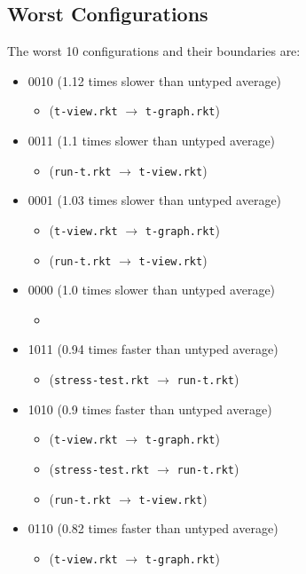 \documentclass{article}
\newcommand{\mono}[1]{\texttt{#1}}
\begin{document}
\subsection{Worst Configurations}
The worst 10 configurations and their boundaries are:
\begin{itemize}
\item 0010 (1.12 times slower than untyped average)
  \begin{itemize}
  \item (\mono{t-view.rkt} $\rightarrow$ \mono{t-graph.rkt})
  \end{itemize}
\item 0011 (1.1 times slower than untyped average)
  \begin{itemize}
  \item (\mono{run-t.rkt} $\rightarrow$ \mono{t-view.rkt})
  \end{itemize}
\item 0001 (1.03 times slower than untyped average)
  \begin{itemize}
  \item (\mono{t-view.rkt} $\rightarrow$ \mono{t-graph.rkt})
  \item (\mono{run-t.rkt} $\rightarrow$ \mono{t-view.rkt})
  \end{itemize}
\item 0000 (1.0 times slower than untyped average)
  \begin{itemize}
  \item 
  \end{itemize}
\item 1011 (0.94 times faster than untyped average)
  \begin{itemize}
  \item (\mono{stress-test.rkt} $\rightarrow$ \mono{run-t.rkt})
  \end{itemize}
\item 1010 (0.9 times faster than untyped average)
  \begin{itemize}
  \item (\mono{t-view.rkt} $\rightarrow$ \mono{t-graph.rkt})
  \item (\mono{stress-test.rkt} $\rightarrow$ \mono{run-t.rkt})
  \item (\mono{run-t.rkt} $\rightarrow$ \mono{t-view.rkt})
  \end{itemize}
\item 0110 (0.82 times faster than untyped average)
  \begin{itemize}
  \item (\mono{t-view.rkt} $\rightarrow$ \mono{t-graph.rkt})

\end{itemize}
\end{itemize}
\end{document}
